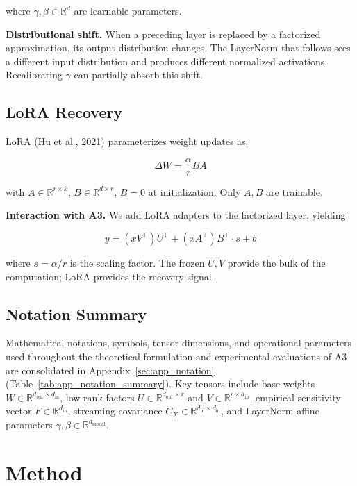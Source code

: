 where $\gamma, \beta \in \mathbb{R}^d$ are learnable parameters.

\textbf{Distributional shift.} When a preceding layer is replaced by a factorized 
approximation, its output distribution changes. The LayerNorm that follows 
sees a different input distribution and produces different normalized 
activations. Recalibrating $\gamma$ can partially absorb this shift.

\subsection{LoRA Recovery}

LoRA (Hu et al., 2021) parameterizes weight updates as:

\[
\Delta W = \frac{\alpha}{r} B A
\tag{3.10}
\]

with $A \in \mathbb{R}^{r \times k}$, $B \in \mathbb{R}^{d \times r}$, 
$B = 0$ at initialization. Only $A, B$ are trainable.

\textbf{Interaction with A3.} We add LoRA adapters to the factorized layer, 
yielding:

\[
y = (x V^\top) U^\top + (x A^\top) B^\top \cdot s + b
\tag{3.11}
\]

where $s = \alpha / r$ is the scaling factor. The frozen $U, V$ provide the 
bulk of the computation; LoRA provides the recovery signal.

\subsection{Notation Summary}
\label{sec:notation_summary}

Mathematical notations, symbols, tensor dimensions, and operational parameters used throughout the theoretical formulation and experimental evaluations of A3 are consolidated in Appendix~\ref{sec:app_notation} (Table~\ref{tab:app_notation_summary}). Key tensors include base weights $W \in \mathbb{R}^{d_{\mathrm{out}} \times d_{\mathrm{in}}}$, low-rank factors $U \in \mathbb{R}^{d_{\mathrm{out}} \times r}$ and $V \in \mathbb{R}^{r \times d_{\mathrm{in}}}$, empirical sensitivity vector $F \in \mathbb{R}^{d_{\mathrm{in}}}$, streaming covariance $C_X \in \mathbb{R}^{d_{\mathrm{in}} \times d_{\mathrm{in}}}$, and LayerNorm affine parameters $\gamma, \beta \in \mathbb{R}^{d_{\mathrm{model}}}$.



\section{Method}

